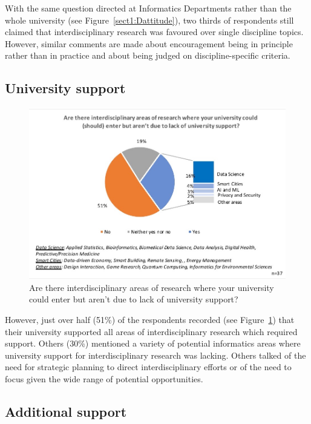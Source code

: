 With the same question directed at Informatics Departments rather than the whole university (see Figure~\ref{sect1:Dattitude}), two thirds of respondents still claimed that interdisciplinary research was favoured over single discipline topics. However, similar comments are made about encouragement being in principle rather than in practice and about being judged on discipline-specific criteria.

\subsection{University support}

\begin{figure}[h]
\centering
\includegraphics[width = \linewidth]{charts/1c.jpg}
\caption{Are there interdisciplinary areas of research where your university
could enter but aren't due to lack of university support?}
\label{sect1:support}
\end{figure}

However, just over half (51\%) of the respondents recorded (see Figure~\ref{sect1:support}) that their university supported all areas of interdisciplinary research which required  support. Others (30\%) mentioned a variety of potential informatics areas where university support for interdisciplinary research was lacking. Others talked of the need for strategic planning to direct interdisciplinary efforts or of the need to focus given the wide range of potential opportunities.

\subsection {Additional support}

